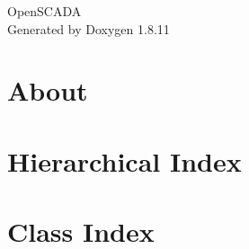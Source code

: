 \documentclass[twoside]{book}
\newcommand{\+}{\discretionary{\mbox{\scriptsize$\hookleftarrow$}}{}{}}
\newcommand{\clearemptydoublepage}{%
  \newpage{\pagestyle{empty}\cleardoublepage}%
}
\begin{document}
\hypersetup{pageanchor=false,
             bookmarksnumbered=true,
             pdfencoding=unicode
            }
\begin{titlepage}
\vspace*{7cm}
\begin{center}%
{\Large Open\+S\+C\+A\+DA }\\
\vspace*{1cm}
{\large Generated by Doxygen 1.8.11}\\
\end{center}
\end{titlepage}
\clearemptydoublepage
\tableofcontents
\clearemptydoublepage
{}
\hypersetup{pageanchor=true}

\chapter{About}
\label{index}\hypertarget{index}{}
\chapter{Hierarchical Index}

\chapter{Class Index}

\end{document}
